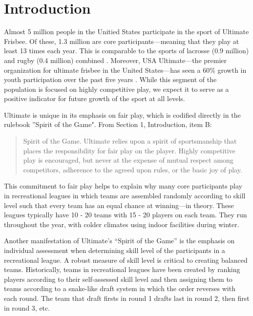 \href{http://}{}\section{Introduction}\label{sec:introduction}

Almost 5 million people in the Unitied States participate in the sport of Ultimate Frisbee.  Of these, 1.3 million are core participants---meaning that they play at least 13 times each year.  This is comparable to the sports of lacrosse (0.9 million) and rugby (0.4 million) combined \cite{sfia_2016}. Moreover, USA Ultimate---the premier organization for ultimate frisbee in the United States---has seen a 60\% growth in youth participation over the past five years \cite{usau_2016}.  While this segment of the population is focused on highly competitive play, we expect it to serve as a positive indicator for future growth of the sport at all levels.

Ultimate is unique in its emphasis on fair play, which is codified directly in the rulebook ''Spirit of the Game".  From Section 1, Introduction, item B:

\begin{quote} Spirit of the Game. Ultimate relies upon a spirit of sportsmanship that places the responsibility for fair play on the player. Highly competitive play is encouraged, but never at the expense of mutual respect among competitors, adherence to the agreed upon rules, or the basic joy of play.
\end{quote}

This commitment to fair play helps to explain why many core participants play in recreational leagues in which teams are assembled randomly according to skill level such that every team has an equal chance at winning---in theory.  These leagues typically have 10 - 20 teams with 15 - 20 players on each team.  They run throughout the year, with colder climates using indoor facilities during winter.

Another manifestation of Ultimate's ``Spirit of the Game'' is the emphasis on individual assessment when determining skill level of the participants in a recreational league.  A robust measure of skill level is critical to creating balanced teams.  Historically, teams in recreational leagues have been created by ranking players according to their self-assessed skill level and then assigning them to teams according to a snake-like draft system in which the order reverses with each round.  The team that draft firsts in round 1 drafts last in round 2, then first in round 3, etc.

